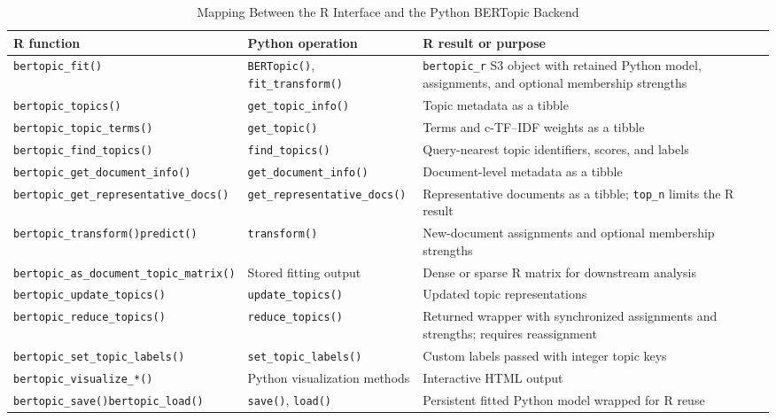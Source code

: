 \documentclass[12pt]{article}
\newcommand{\fcode}[1]{\nolinkurl{#1}}
\begin{document}
\begin{table}[htbp]
\centering
\caption{Mapping Between the R Interface and the Python BERTopic Backend}
\label{tab:api_map}
\begin{threeparttable}
\small
\begin{tabularx}{\linewidth}{>{\raggedright\arraybackslash}p{3.8cm}
                             >{\raggedright\arraybackslash}p{3.4cm}
                             >{\raggedright\arraybackslash}X}
\toprule
R function & Python operation & R result or purpose \\
\midrule
\fcode{bertopic_fit()} & \fcode{BERTopic()}, \fcode{fit_transform()} & \fcode{bertopic_r} S3 object with retained Python model, assignments, and optional membership strengths \\
\fcode{bertopic_topics()} & \fcode{get_topic_info()} & Topic metadata as a tibble \\
\fcode{bertopic_topic_terms()} & \fcode{get_topic()} & Terms and c-TF--IDF weights as a tibble \\
\fcode{bertopic_find_topics()} & \fcode{find_topics()} & Query-nearest topic identifiers, scores, and labels \\
\fcode{bertopic_get_document_info()} & \fcode{get_document_info()} & Document-level metadata as a tibble \\
\fcode{bertopic_get_representative_docs()} & \fcode{get_representative_docs()} & Representative documents as a tibble; \fcode{top_n} limits the R result \\
\fcode{bertopic_transform()}\newline \fcode{predict()} & \fcode{transform()} & New-document assignments and optional membership strengths \\
\fcode{bertopic_as_document_topic_matrix()} & Stored fitting output & Dense or sparse R matrix for downstream analysis \\
\fcode{bertopic_update_topics()} & \fcode{update_topics()} & Updated topic representations \\
\fcode{bertopic_reduce_topics()} & \fcode{reduce_topics()} & Returned wrapper with synchronized assignments and strengths; requires reassignment \\
\fcode{bertopic_set_topic_labels()} & \fcode{set_topic_labels()} & Custom labels passed with integer topic keys \\
\fcode{bertopic_visualize_*()} & Python visualization methods & Interactive HTML output \\
\fcode{bertopic_save()}\newline \fcode{bertopic_load()} & \fcode{save()}, \fcode{load()} & Persistent fitted Python model wrapped for R reuse \\
\bottomrule
\end{tabularx}
\end{threeparttable}
\end{table}
\end{document}
